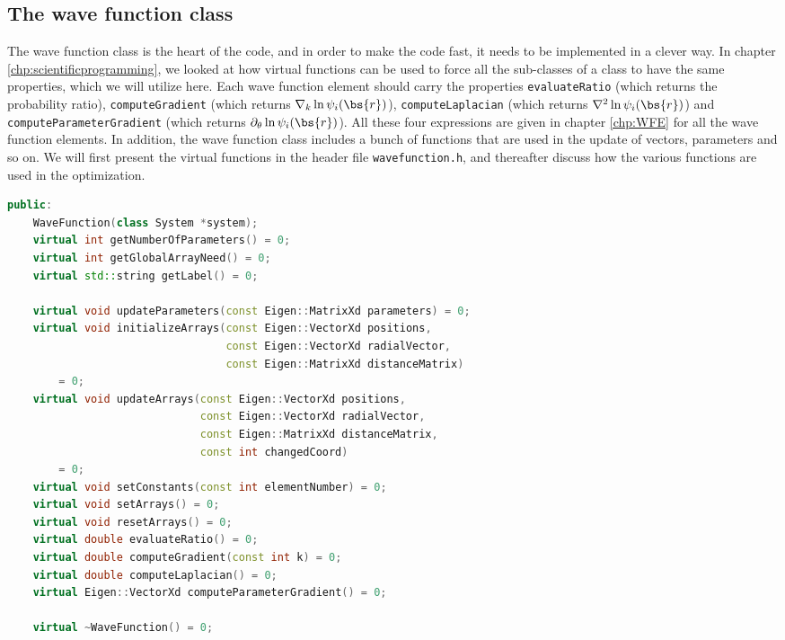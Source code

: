 \subsection{The wave function class} \label{sec:thewavefunctionclass}
The wave function class is the heart of the code, and in order to make the code fast, it needs to be implemented in a clever way. In chapter \ref{chp:scientificprogramming}, we looked at how virtual functions can be used to force all the sub-classes of a class to have the same properties, which we will utilize here. Each wave function element should carry the properties \texttt{evaluateRatio} (which returns the probability ratio), \texttt{computeGradient} (which returns $\nabla_k\ln\psi_i(\bs{r})$), \texttt{computeLaplacian} (which returns $\nabla^2\ln\psi_i(\bs{r})$) and \texttt{computeParameterGradient} (which returns $\partial_{\theta}\ln\psi_i(\bs{r})$). All these four expressions are given in chapter \ref{chp:WFE} for all the wave function elements. In addition, the wave function class includes a bunch of functions that are used in the update of vectors, parameters and so on. We will first present the virtual functions in the header file \texttt{wavefunction.h}, and thereafter discuss how the various functions are used in the optimization. 
\lstset{basicstyle=\scriptsize}
\begin{lstlisting}[language=c++,caption={The code is taken from \texttt{wavefunction.h}, presenting all the virtual functions that are used in the wave function class. Clang formating is used.}]
public:
	WaveFunction(class System *system);
	virtual int getNumberOfParameters() = 0;
	virtual int getGlobalArrayNeed() = 0;
	virtual std::string getLabel() = 0;

	virtual void updateParameters(const Eigen::MatrixXd parameters) = 0;
	virtual void initializeArrays(const Eigen::VectorXd positions,
								  const Eigen::VectorXd radialVector,
								  const Eigen::MatrixXd distanceMatrix)
		= 0;
	virtual void updateArrays(const Eigen::VectorXd positions,
							  const Eigen::VectorXd radialVector,
							  const Eigen::MatrixXd distanceMatrix,
							  const int changedCoord)
		= 0;
	virtual void setConstants(const int elementNumber) = 0;
	virtual void setArrays() = 0;
	virtual void resetArrays() = 0;
	virtual double evaluateRatio() = 0;
	virtual double computeGradient(const int k) = 0;
	virtual double computeLaplacian() = 0;
	virtual Eigen::VectorXd computeParameterGradient() = 0;

	virtual ~WaveFunction() = 0;

\end{lstlisting}

